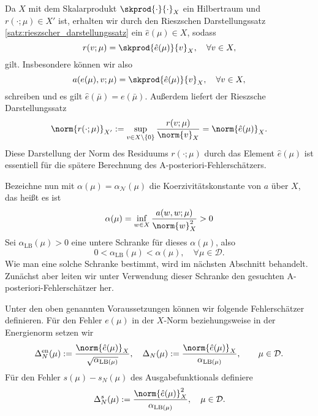 Da $X$ mit dem Skalarprodukt $\skprod{\cdot}{\cdot}_X$ ein Hilbertraum und $r(\cdot; \mu) \in X'$ ist, erhalten wir durch den Rieszschen Darstellungssatz \ref{satz:rieszscher_darstellungssatz} ein $\hat e(\mu) \in X$, sodass
\begin{equation}
    \label{eq:residuum_riesz}
    r(v; \mu) = \skprod{\hat e(\mu)}{v}_X, \quad \forall v \in X,
\end{equation}
gilt.
Insbesondere können wir also
\begin{equation}
    \label{eq:a_von_e_gl_skprod_e}
    a(e(\mu), v; \mu) = \skprod{\hat e(\mu)}{v}_X, \quad \forall v \in X,
\end{equation}
schreiben und es gilt $\hat e(\bar \mu) = e(\bar \mu)$.
Außerdem liefert der Rieszsche Darstellungssatz
\begin{equation}
    \label{eq:residuum_norm_gl_hat_e_norm}
    \norm{r(\cdot; \mu)}_{X'} := \sup_{v \in X \setminus \left\{ 0 \right\}} \frac{r(v; \mu)}{\norm{v}_X} = \norm{\hat e(\mu)}_X.
\end{equation}
Diese Darstellung der Norm des Residuums $r(\cdot; \mu)$ durch das Element $\hat e(\mu)$ ist essentiell für die spätere Berechnung des A-posteriori-Fehlerschätzers.

Bezeichne nun mit $\alpha(\mu) = \alpha_{\mathcal N}(\mu)$ die Koerzivitätskonstante von $a$ über $X$, das heißt es ist
\begin{equation}
            \alpha(\mu) = \inf_{w \in X} \frac{a(w, w; \mu)}{\norm{w}^2_X} > 0
\end{equation}
Sei $\alpha_{\text{LB}}(\mu) > 0$ eine untere Schranke für dieses $\alpha(\mu)$, also
\begin{equation}
    \label{eq:alpha_lb}
    0 < \alpha_{\text{LB}}(\mu) < \alpha(\mu), \quad \forall \mu \in \mathcal D.
\end{equation}
Wie man eine solche Schranke bestimmt, wird im nächsten Abschnitt behandelt.
Zunächst aber leiten wir unter Verwendung dieser Schranke den gesuchten A-posteriori-Fehlerschätzer her.

\begin{Definition}
    Unter den oben genannten Voraussetzungen können wir folgende Fehlerschätzer definieren.
    Für den Fehler $e(\mu)$ in der $X$-Norm beziehungsweise in der Energienorm setzen wir
    \begin{equation}
        \Delta^{\text{en}}_N(\mu) := \frac{\norm{\hat e(\mu)}_X}{\sqrt{\alpha_{\text{LB}(\mu)}}}
        , \quad
        \Delta_N(\mu) := \frac{\norm{\hat e(\mu)}_X}{\alpha_{\text{LB}(\mu)}}
        , \qquad \mu \in \mathcal D.
    \end{equation}
    Für den Fehler $s(\mu) - s_N(\mu)$ des Ausgabefunktionals definiere
    \begin{equation}
        \Delta^s_N(\mu) := \frac{\norm{\hat e(\mu)}_X^2}{\alpha_{\text{LB}(\mu)}}, \quad \mu \in \mathcal D.
    \end{equation}
\end{Definition}

